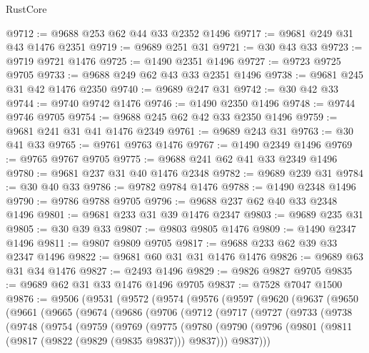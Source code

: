 \begin{lexlean}{RustCore}
\begin{coremodule}
@9712 := @9688 @253 @62 @44 @33 @2352 @1496
@9717 := @9681 @249 @31 @43 @1476 @2351
@9719 := @9689 @251 @31
@9721 := @30 @43 @33
@9723 := @9719 @9721 @1476
@9725 := @1490 @2351 @1496
@9727 := @9723 @9725 @9705
@9733 := @9688 @249 @62 @43 @33 @2351 @1496
@9738 := @9681 @245 @31 @42 @1476 @2350
@9740 := @9689 @247 @31
@9742 := @30 @42 @33
@9744 := @9740 @9742 @1476
@9746 := @1490 @2350 @1496
@9748 := @9744 @9746 @9705
@9754 := @9688 @245 @62 @42 @33 @2350 @1496
@9759 := @9681 @241 @31 @41 @1476 @2349
@9761 := @9689 @243 @31
@9763 := @30 @41 @33
@9765 := @9761 @9763 @1476
@9767 := @1490 @2349 @1496
@9769 := @9765 @9767 @9705
@9775 := @9688 @241 @62 @41 @33 @2349 @1496
@9780 := @9681 @237 @31 @40 @1476 @2348
@9782 := @9689 @239 @31
@9784 := @30 @40 @33
@9786 := @9782 @9784 @1476
@9788 := @1490 @2348 @1496
@9790 := @9786 @9788 @9705
@9796 := @9688 @237 @62 @40 @33 @2348 @1496
@9801 := @9681 @233 @31 @39 @1476 @2347
@9803 := @9689 @235 @31
@9805 := @30 @39 @33
@9807 := @9803 @9805 @1476
@9809 := @1490 @2347 @1496
@9811 := @9807 @9809 @9705
@9817 := @9688 @233 @62 @39 @33 @2347 @1496
@9822 := @9681 @60 @31 @31 @1476 @1476
@9826 := @9689 @63 @31 @34 @1476
@9827 := @2493 @1496
@9829 := @9826 @9827 @9705
@9835 := @9689 @62 @31 @33 @1476 @1496 @9705
@9837 := @7528 @7047 @1500
@9876 := @9506
    (@9531
      (@9572
        (@9574
          (@9576
            (@9597
              (@9620
                (@9637
                  (@9650
                    (@9661
                      (@9665
                        (@9674
                          (@9686
                            (@9706
                              (@9712
                                (@9717
                                  (@9727
                                    (@9733
                                      (@9738
                                        (@9748
                                          (@9754
                                            (@9759
                                              (@9769
                                                (@9775
                                                  (@9780
                                                    (@9790
                                                      (@9796
                                                        (@9801
                                                          (@9811
                                                            (@9817
                                                              (@9822 (@9829 (@9835 @9837)))
                                                              @9837)))
                                                        @9837)))

\end{coremodule}
\end{lexlean}
